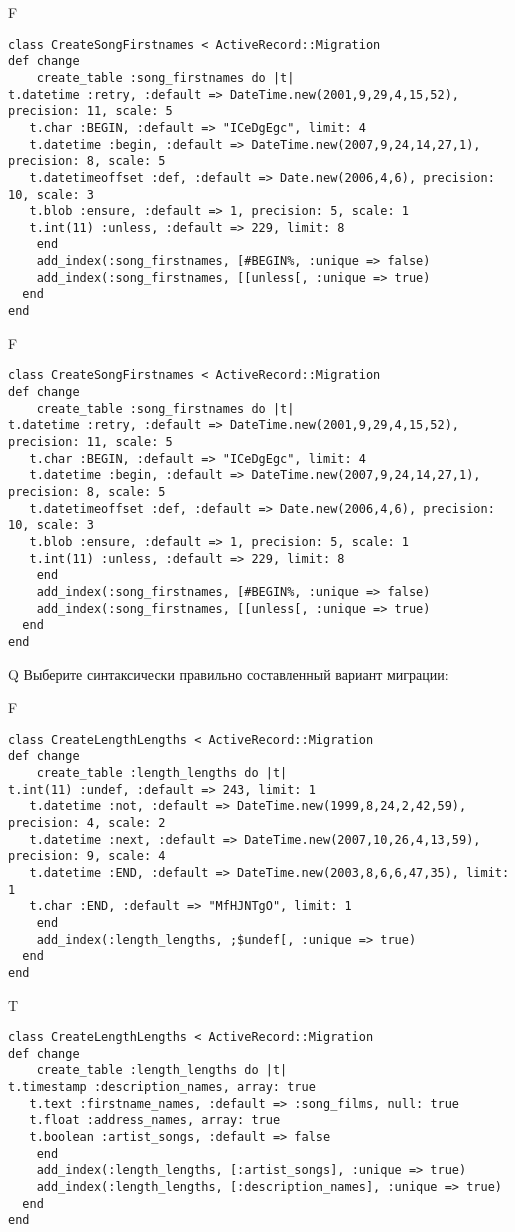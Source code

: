 F
\begin{verbatim}
class CreateSongFirstnames < ActiveRecord::Migration
def change
	create_table :song_firstnames do |t|
t.datetime :retry, :default => DateTime.new(2001,9,29,4,15,52), precision: 11, scale: 5
   t.char :BEGIN, :default => "ICeDgEgc", limit: 4
   t.datetime :begin, :default => DateTime.new(2007,9,24,14,27,1), precision: 8, scale: 5
   t.datetimeoffset :def, :default => Date.new(2006,4,6), precision: 10, scale: 3
   t.blob :ensure, :default => 1, precision: 5, scale: 1
   t.int(11) :unless, :default => 229, limit: 8
   	end
	add_index(:song_firstnames, [#BEGIN%, :unique => false)
 	add_index(:song_firstnames, [[unless[, :unique => true)
  end 
end

\end{verbatim}

F
\begin{verbatim}
class CreateSongFirstnames < ActiveRecord::Migration
def change
	create_table :song_firstnames do |t|
t.datetime :retry, :default => DateTime.new(2001,9,29,4,15,52), precision: 11, scale: 5
   t.char :BEGIN, :default => "ICeDgEgc", limit: 4
   t.datetime :begin, :default => DateTime.new(2007,9,24,14,27,1), precision: 8, scale: 5
   t.datetimeoffset :def, :default => Date.new(2006,4,6), precision: 10, scale: 3
   t.blob :ensure, :default => 1, precision: 5, scale: 1
   t.int(11) :unless, :default => 229, limit: 8
   	end
	add_index(:song_firstnames, [#BEGIN%, :unique => false)
 	add_index(:song_firstnames, [[unless[, :unique => true)
  end 
end

\end{verbatim}

Q
Выберите синтаксически правильно составленный вариант миграции:

F
\begin{verbatim}
class CreateLengthLengths < ActiveRecord::Migration
def change
	create_table :length_lengths do |t|
t.int(11) :undef, :default => 243, limit: 1
   t.datetime :not, :default => DateTime.new(1999,8,24,2,42,59), precision: 4, scale: 2
   t.datetime :next, :default => DateTime.new(2007,10,26,4,13,59), precision: 9, scale: 4
   t.datetime :END, :default => DateTime.new(2003,8,6,6,47,35), limit: 1
   t.char :END, :default => "MfHJNTgO", limit: 1
   	end
	add_index(:length_lengths, ;$undef[, :unique => true)
  end 
end

\end{verbatim}

T
\begin{verbatim}
class CreateLengthLengths < ActiveRecord::Migration
def change
	create_table :length_lengths do |t|
t.timestamp :description_names, array: true
   t.text :firstname_names, :default => :song_films, null: true
   t.float :address_names, array: true
   t.boolean :artist_songs, :default => false
   	end
	add_index(:length_lengths, [:artist_songs], :unique => true)
 	add_index(:length_lengths, [:description_names], :unique => true)
  end 
end

\end{verbatim}

